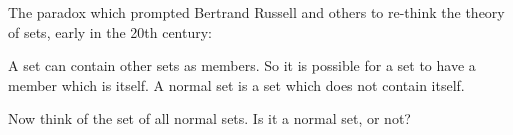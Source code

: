The paradox which prompted Bertrand Russell and others
to re-think the theory of sets, early in the 20th
century:
\par
A set can contain other sets as members. So it is
possible for a set to have a member which is itself.
A normal set is a set which does not contain itself.
\par
Now think of the set of all normal sets. Is it a normal
set, or not?